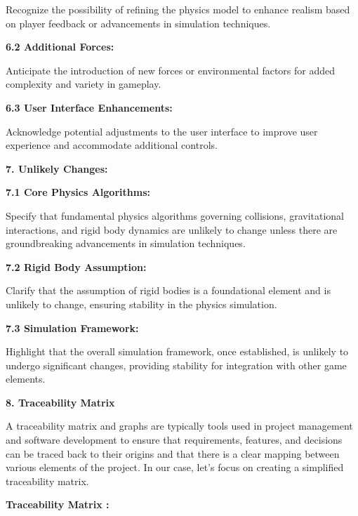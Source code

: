 \documentclass[
]{article}
\begin{document}
Recognize the possibility of refining the physics model to enhance
realism based on player feedback or advancements in simulation
techniques.

\textbf{6.2 Additional Forces:}

Anticipate the introduction of new forces or environmental factors for
added complexity and variety in gameplay.

\textbf{6.3 User Interface Enhancements:}

Acknowledge potential adjustments to the user interface to improve user
experience and accommodate additional controls.

\textbf{7. Unlikely Changes:}

\textbf{7.1 Core Physics Algorithms:}

Specify that fundamental physics algorithms governing collisions,
gravitational interactions, and rigid body dynamics are unlikely to
change unless there are groundbreaking advancements in simulation
techniques.

\textbf{7.2 Rigid Body Assumption:}

Clarify that the assumption of rigid bodies is a foundational element
and is unlikely to change, ensuring stability in the physics simulation.

\textbf{7.3 Simulation Framework:}

Highlight that the overall simulation framework, once established, is
unlikely to undergo significant changes, providing stability for
integration with other game elements.

\textbf{8. Traceability Matrix}

A traceability matrix and graphs are typically tools used in project
management and software development to ensure that requirements,
features, and decisions can be traced back to their origins and that
there is a clear mapping between various elements of the project. In our
case, let's focus on creating a simplified traceability matrix.

\textbf{Traceability Matrix :}
\end{document}
